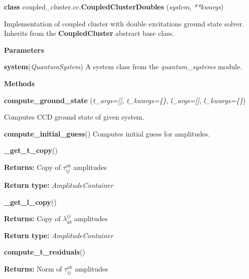 \begin{tcolorbox}
    {\selectfont
    \textbf{class} coupled\_cluster.cc.\textbf{CoupledClusterDoubles}
    (\emph{system}, \emph{**kwargs})

    \vspace{1em}
    Implementation of coupled cluster with double excitations ground state solver. 
    Inherits from the \textbf{CoupledCluster} abstract base class.

    \vspace{1em}
    \textbf{Parameters}

    \hspace{2em}\textbf{system}(\emph{QuantumSystem}) A system class from the 
        \emph{quantum\_systems} module.

    \vspace{1em}
    \textbf{Methods} 
 
    \hspace{2em} \textbf{compute\_ground\_state}
        (\emph{t\_args=[]}, \emph{t\_kwargs=\{\}}, \emph{l\_args=[]}, \emph{l\_kwargs=\{\}})
        \begin{adjustwidth}{4em}{}
        Computes CCD ground state of given system.
        \end{adjustwidth}  

    \hspace{2em} \textbf{compute\_initial\_guess}()
        Computes initial guess for amplitudes.

    \hspace{2em} \textbf{\_get\_t\_copy}()
        \begin{adjustwidth}{4em}{}
        \textbf{Returns:} Copy of $\tau^{ab}_{ij}$ amplitudes
        
        \textbf{Return type:} \emph{AmplitudeContainer}
        \end{adjustwidth}

    \hspace{2em} \textbf{\_get\_l\_copy}()
        \begin{adjustwidth}{4em}{}
        \textbf{Returns:} Copy of $\lambda^{ij}_{ab}$ amplitudes
        
        \textbf{Return type:} \emph{AmplitudeContainer}
        \end{adjustwidth}

    \hspace{2em} \textbf{compute\_t\_residuals}()
        \begin{adjustwidth}{4em}{}
        \textbf{Returns:} Norm of $\tau^{ab}_{ij}$ amplitudes
        

\end{adjustwidth}}
\end{tcolorbox}
